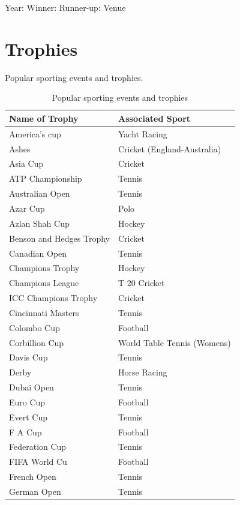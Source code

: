 \documentclass[
  openany]{book}
\begin{document}
Year: Winner: Runner-up: Venue

\hypertarget{trophies}{%
\section{Trophies}\label{trophies}}

Popular sporting events and trophies.

\begin{longtable}[t]{ll}
\caption{\label{tab:sporting-trophies}Popular sporting events and trophies}\\
\toprule
Name of Trophy & Associated Sport\\
\midrule
\rowcolor{gray!6}  America's cup & Yacht Racing\\
Ashes & Cricket (England-Australia)\\
\rowcolor{gray!6}  Asia Cup & Cricket\\
ATP Championship & Tennis\\
\rowcolor{gray!6}  Australian Open & Tennis\\
\addlinespace
Azar Cup & Polo\\
\rowcolor{gray!6}  Azlan Shah Cup & Hockey\\
Benson and Hedges Trophy & Cricket\\
\rowcolor{gray!6}  Canadian Open & Tennis\\
Champions Trophy & Hockey\\
\addlinespace
\rowcolor{gray!6}  Champions League & T 20 Cricket\\
ICC Champions Trophy & Cricket\\
\rowcolor{gray!6}  Cincinnati Masters & Tennis\\
Colombo Cup & Football\\
\rowcolor{gray!6}  Corbillion Cup & World Table Tennis (Womens)\\
\addlinespace
Davis Cup & Tennis\\
\rowcolor{gray!6}  Derby & Horse Racing\\
Dubai Open & Tennis\\
\rowcolor{gray!6}  Euro Cup & Football\\
Evert Cup & Tennis\\
\addlinespace
\rowcolor{gray!6}  F A Cup & Football\\
Federation Cup & Tennis\\
\rowcolor{gray!6}  FIFA World Cu & Football\\
French Open & Tennis\\
\rowcolor{gray!6}  German Open & Tennis\\

\end{longtable}
\end{document}
